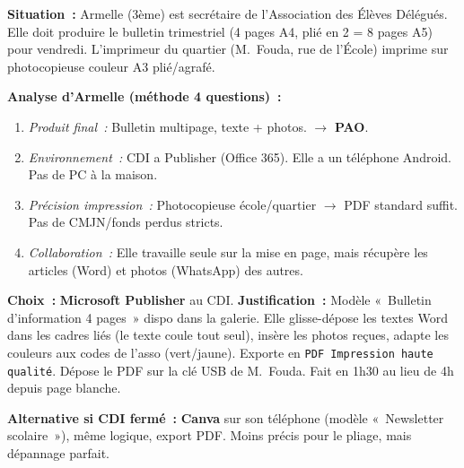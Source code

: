 \documentclass[11pt]{article}
\begin{document}
\begin{exemplebox}
\textbf{Situation~:} Armelle (3ème) est secrétaire de l'Association des Élèves Délégués. Elle doit produire le bulletin trimestriel (4 pages A4, plié en 2 = 8 pages A5) pour vendredi. L'imprimeur du quartier (M.~Fouda, rue de l'École) imprime sur photocopieuse couleur A3 plié/agrafé.

\textbf{Analyse d'Armelle (méthode 4 questions)~:}
\begin{enumerate}
    \item \textit{Produit final~:} Bulletin multipage, texte + photos. $\rightarrow$ \textbf{PAO}.
    \item \textit{Environnement~:} CDI a Publisher (Office 365). Elle a un téléphone Android. Pas de PC à la maison.
    \item \textit{Précision impression~:} Photocopieuse école/quartier $\rightarrow$ PDF standard suffit. Pas de CMJN/fonds perdus stricts.
    \item \textit{Collaboration~:} Elle travaille seule sur la mise en page, mais récupère les articles (Word) et photos (WhatsApp) des autres.
\end{enumerate}

\textbf{Choix~:} \textbf{Microsoft Publisher} au CDI.
\textbf{Justification~:} Modèle «~Bulletin d'information 4 pages~» dispo dans la galerie. Elle glisse-dépose les textes Word dans les cadres liés (le texte coule tout seul), insère les photos reçues, adapte les couleurs aux codes de l'asso (vert/jaune). Exporte en \texttt{PDF Impression haute qualité}. Dépose le PDF sur la clé USB de M.~Fouda. Fait en 1h30 au lieu de 4h depuis page blanche.

\textbf{Alternative si CDI fermé~:} \textbf{Canva} sur son téléphone (modèle «~Newsletter scolaire~»), même logique, export PDF. Moins précis pour le pliage, mais dépannage parfait.
\end{exemplebox}
\end{document}
